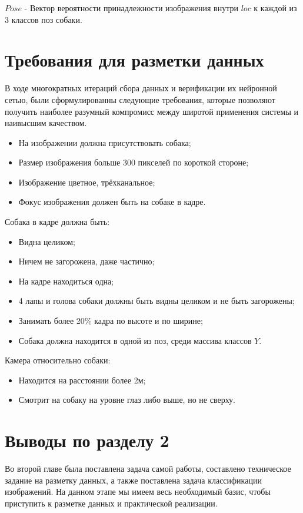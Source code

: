 $Pose$ - Вектор вероятности принадлежности изображения внутри $loc$ к каждой из 3 классов поз собаки.

\section{Требования для разметки данных}

В ходе многократных итераций сбора данных и верификации их нейронной сетью, были сформулированны следующие требования, которые позволяют получить наиболее разумный компромисс между широтой применения системы и наивысшим качеством.

\begin{itemize}[wide]
    \item На изображении должна присутствовать собака;
    \item Размер изображения больше 300 пикселей по короткой стороне;
    \item Изображение цветное, трёхканальное;
    \item Фокус изображения должен быть на собаке в кадре.
\end{itemize}

Собака в кадре должна быть:
\begin{itemize}[wide]
    \item Видна целиком;
    \item Ничем не загорожена, даже частично;
    \item На кадре находиться одна;
    \item 4 лапы и голова собаки должны быть видны целиком и не быть загорожены;
    \item Занимать более 20\% кадра по высоте и по ширине;
    \item Собака должна находится в одной из поз, среди массива классов $Y$.
 \end{itemize}
 
Камера относительно собаки:
\begin{itemize}[wide]
    \item Находится на расстоянии более 2м;
    \item Смотрит на собаку на уровне глаз либо выше, но не сверху.
\end{itemize}


\section*{Выводы по разделу 2}
Во второй главе была поставлена задача самой работы, составлено техническое задание на разметку данных, а также поставлена задача классификации изображений. На данном этапе мы имеем весь необходимый базис, чтобы приступить к разметке данных и практической реализации.